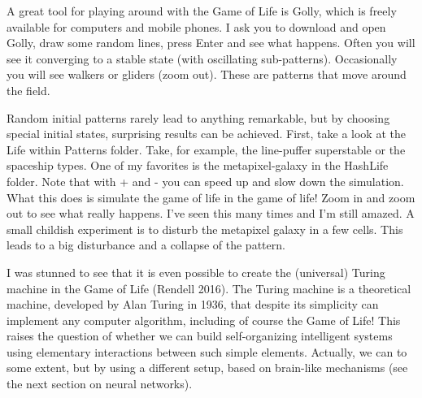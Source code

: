 \documentclass[
  a4paper,
  DIV=11,
  numbers=noendperiod]{scrreprt}
\begin{document}
A great tool for playing around with the Game of Life is Golly, which is
freely available for computers and mobile phones. I ask you to download
and open Golly, draw some random lines, press Enter and see what
happens. Often you will see it converging to a stable state (with
oscillating sub-patterns). Occasionally you will see walkers or gliders
(zoom out). These are patterns that move around the field.

Random initial patterns rarely lead to anything remarkable, but by
choosing special initial states, surprising results can be achieved.
First, take a look at the Life within Patterns folder. Take, for
example, the line-puffer superstable or the spaceship types. One of my
favorites is the metapixel-galaxy in the HashLife folder. Note that with
+ and - you can speed up and slow down the simulation. What this does is
simulate the game of life in the game of life! Zoom in and zoom out to
see what really happens. I've seen this many times and I'm still amazed.
A small childish experiment is to disturb the metapixel galaxy in a few
cells. This leads to a big disturbance and a collapse of the pattern.

I was stunned to see that it is even possible to create the (universal)
Turing machine in the Game of Life (Rendell 2016). The Turing machine is
a theoretical machine, developed by Alan Turing in 1936, that despite
its simplicity can implement any computer algorithm, including of course
the Game of Life! This raises the question of whether we can build
self-organizing intelligent systems using elementary interactions
between such simple elements. Actually, we can to some extent, but by
using a different setup, based on brain-like mechanisms (see the next
section on neural networks).
\end{document}
